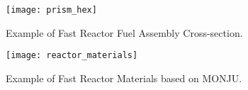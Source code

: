\begin{frame}
  \begin{figure}
    \centering
    \texttt{[image: prism\_hex]}
    \caption{Example of Fast Reactor Fuel Assembly Cross-section.}
    \label{fig:prism_hex}
  \end{figure}
\end{frame}

\begin{frame}
  \begin{figure}
    \centering
    \texttt{[image: reactor\_materials]}
    \caption{Example of Fast Reactor Materials based on MONJU.}
    \label{fig:reactor_materials}
  \end{figure}
\end{frame}

